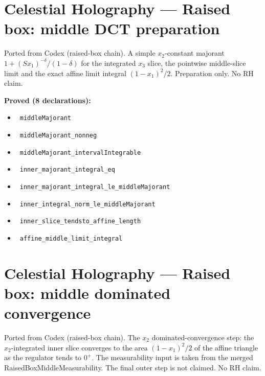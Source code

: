 \documentclass{report}
\theoremstyle{definition}
\begin{document}
\section{Celestial Holography --- Raised box: middle DCT preparation}
Ported from Codex (raised-box chain). A simple $x_2$-constant majorant $1+(Sx_1)^{-\delta}/(1-\delta)$ for the integrated $x_3$ slice, the pointwise middle-slice limit and the exact affine limit integral $(1-x_1)^2/2$. Preparation only. No RH claim.

\noindent\textbf{Proved (8 declarations):}
\begin{itemize}
  \item {}\leanok\ \texttt{middleMajorant}
  \item {}\leanok\ \texttt{middleMajorant\_nonneg}
  \item {}\leanok\ \texttt{middleMajorant\_intervalIntegrable}
  \item {}\leanok\ \texttt{inner\_majorant\_integral\_eq}
  \item {}\leanok\ \texttt{inner\_majorant\_integral\_le\_middleMajorant}
  \item {}\leanok\ \texttt{inner\_integral\_norm\_le\_middleMajorant}
  \item {}\leanok\ \texttt{inner\_slice\_tendsto\_affine\_length}
  \item {}\leanok\ \texttt{affine\_middle\_limit\_integral}
\end{itemize}

\section{Celestial Holography --- Raised box: middle dominated convergence}
Ported from Codex (raised-box chain). The $x_2$ dominated-convergence step: the $x_2$-integrated inner slice converges to the area $(1-x_1)^2/2$ of the affine triangle as the regulator tends to $0^+$. The measurability input is taken from the merged RaisedBoxMiddleMeasurability. The final outer step is not claimed. No RH claim.
\end{document}
